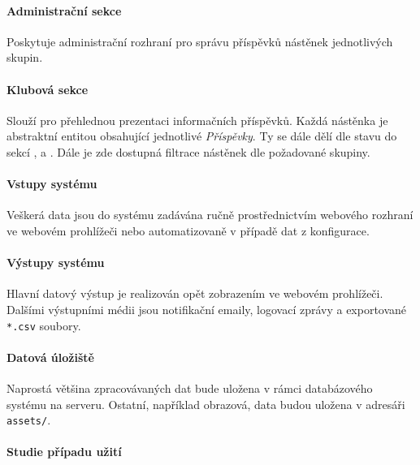 \documentclass[11pt,oneside]{fithesis}
\begin{document}
           \paragraph*{Administrační sekce}

            Poskytuje administrační rozhraní pro správu příspěvků nástěnek jednotlivých skupin.

           \paragraph*{Klubová sekce}

           Slouží pro přehlednou prezentaci informačních příspěvků.
           Každá nástěnka je abstraktní entitou obsahující jednotlivé \textit{Příspěvky}. Ty se dále dělí dle stavu do sekcí ,  a . Dále je zde dostupná filtrace nástěnek dle požadované skupiny.


            \paragraph*{Vstupy systému}

            Veškerá data jsou do systému zadávána ručně prostřednictvím webového rozhraní ve webovém prohlížeči nebo automatizovaně v případě dat z konfigurace.

            \paragraph*{Výstupy systému}

            Hlavní datový výstup je realizován opět zobrazením ve webovém prohlížeči. Dalšími výstupními médii jsou notifikační emaily, logovací zprávy a exportované \verb|*.csv| soubory. 

            \paragraph*{Datová úložiště}

            Naprostá většina zpracovávaných dat bude uložena v rámci databázového systému na serveru.
            Ostatní, například obrazová, data budou uložena v adresáři \verb|assets/|.


            \paragraph*{Studie případu užití}
\end{document}

